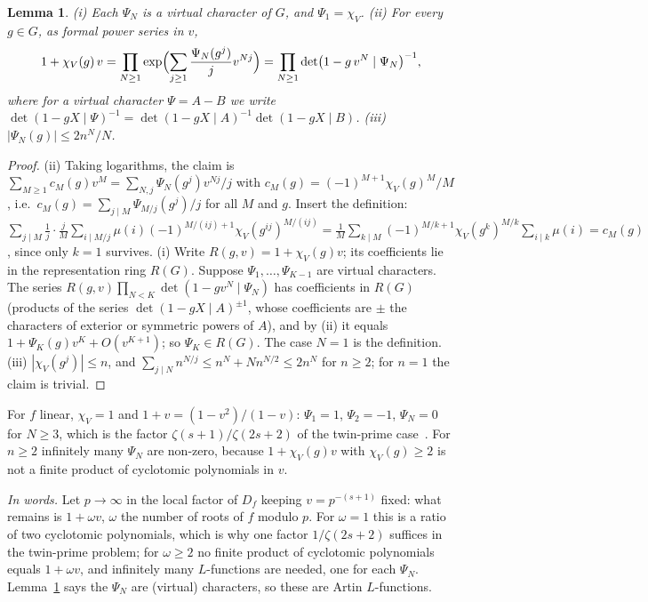 \documentclass[11pt,a4paper]{article}
\newtheorem{lemma}[theorem]{Lemma}
\theoremstyle{remark}\newtheorem{remark}[theorem]{Remark}
\begin{document}
\begin{lemma}\label{lem:psi}
(i) Each $\Psi_N$ is a virtual character of $G$, and $\Psi_1=\chi_V$.
(ii) For every $g\in G$, as formal power series in $v$,
\[
1+\chi_V(g)\,v=\prod_{N\ge1}\exp\Bigl(\sum_{j\ge1}\frac{\Psi_N(g^j)}{j}v^{Nj}\Bigr)
=\prod_{N\ge1}\det\bigl(1-g\,v^N\mid\Psi_N\bigr)^{-1},
\]
where for a virtual character $\Psi=A-B$ we write $\det(1-gX\mid\Psi)^{-1}=\det(1-gX\mid A)^{-1}\det(1-gX\mid B)$.
(iii) $|\Psi_N(g)|\le 2n^N/N$.
\end{lemma}
\begin{proof}
(ii) Taking logarithms, the claim is $\sum_{M\ge1}c_M(g)v^M=\sum_{N,j}\Psi_N(g^j)v^{Nj}/j$ with
$c_M(g)=(-1)^{M+1}\chi_V(g)^M/M$, i.e.\ $c_M(g)=\sum_{j\mid M}\Psi_{M/j}(g^j)/j$ for all $M$ and $g$. Insert the
definition: $\sum_{j\mid M}\frac1j\cdot\frac{j}{M}\sum_{i\mid M/j}\mu(i)(-1)^{M/(ij)+1}\chi_V(g^{ij})^{M/(ij)}
=\frac1M\sum_{k\mid M}(-1)^{M/k+1}\chi_V(g^k)^{M/k}\sum_{i\mid k}\mu(i)=c_M(g)$, since only $k=1$ survives.
(i) Write $R(g,v)=1+\chi_V(g)v$; its coefficients lie in the representation ring $R(G)$. Suppose
$\Psi_1,\dots,\Psi_{K-1}$ are virtual characters. The series
$R(g,v)\prod_{N<K}\det(1-gv^N\mid\Psi_N)$ has coefficients in $R(G)$ (products of the series
$\det(1-gX\mid A)^{\pm1}$, whose coefficients are $\pm$ the characters of exterior or symmetric powers of
$A$), and by (ii) it equals $1+\Psi_K(g)v^K+O(v^{K+1})$; so $\Psi_K\in R(G)$. The case $N=1$ is the
definition. (iii) $|\chi_V(g^j)|\le n$, and $\sum_{j\mid N}n^{N/j}\le n^N+N n^{N/2}\le2n^N$ for $n\ge2$; for $n=1$ the claim is trivial.
\end{proof}

For $f$ linear, $\chi_V=1$ and $1+v=(1-v^2)/(1-v)$: $\Psi_1=1$, $\Psi_2=-1$, $\Psi_N=0$ for $N\ge3$, which is
the factor $\zeta(s+1)/\zeta(2s+2)$ of the twin-prime case~\cite{GoldstonSuriajaya2021}. For $n\ge2$
infinitely many $\Psi_N$ are non-zero, because $1+\chi_V(g)v$ with $\chi_V(g)\ge2$ is not a finite product
of cyclotomic polynomials in $v$.

\emph{In words.} Let $p\to\infty$ in the local factor of $D_f$ keeping $v=p^{-(s+1)}$ fixed: what remains is
$1+\omega v$, $\omega$ the number of roots of $f$ modulo $p$. For $\omega=1$ this is a ratio of two cyclotomic
polynomials, which is why one factor $1/\zeta(2s+2)$ suffices in the twin-prime problem; for $\omega\ge2$ no
finite product of cyclotomic polynomials equals $1+\omega v$, and infinitely many $L$-functions are needed,
one for each $\Psi_N$. Lemma~\ref{lem:psi} says the $\Psi_N$ are (virtual) characters, so these are Artin
$L$-functions.
\end{document}
